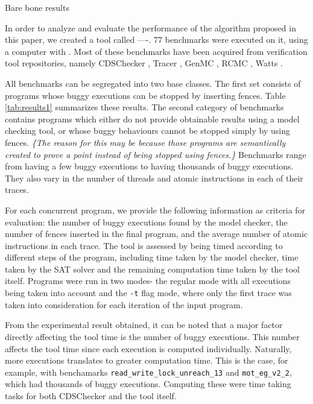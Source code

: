 \begin{table}
		
	\caption{Bare bone results}
	\label{tab:results1}
\end{table}

In order to analyze and evaluate the performance of the algorithm 
proposed in this paper, we created a tool called ----. 77 benchmarks were
executed on it, using a computer with .
Most of these benchmarks have been acquired from verification tool
repositories, namely CDSChecker \cite{cds}, Tracer \cite{tracer2018},
GenMC \cite{genmc-PLDI19}, RCMC \cite{rcmc-POPL18}, Watts \cite{watts}.

All benchmarks can be segregated into two base classes. The first set consists of 
programs whose buggy executions can be stopped by inserting fences. Table \ref{tab:results1}
summarizes these results. The second category of benchmarks contains programs which
either do not provide obtainable results using a model checking tool, or
whose buggy behaviours cannot be stopped simply by using fences. \textit{\{The reason
for this may be because those programs are semantically created to prove
a point instead of being stopped using fences.\}} Benchmarks range from
having a few buggy executions to having thousands of buggy executions. They
also vary in the number of threads and atomic instructions in each of
their traces.

For each concurrent program, we provide the following information as criteria for evaluation:
the number of buggy executions found by the model checker, the number of fences
inserted in the final program, and the average number of atomic instructions
in each trace. The tool is assessed by being timed according to different steps
of the program, including time taken by the model checker, time taken by the
SAT solver and the remaining computation time taken by the tool itself. Programs
were run in two modes- the regular mode with all executions
being taken into account and the \texttt{-t} flag mode, where only the first
trace was taken into consideration for each iteration of the input program.

From the experimental result obtained, it can be noted that a major factor directly affecting 
the tool time is the number of buggy executions. This number affects the tool 
time since each execution is computed individually. Naturally, more executions translates to
greater computation time. This is the case, for example, with benchamarks
\texttt{read\_write\_lock\_unreach\_13} and \texttt{mot\_eg\_v2\_2}, which had thousands
of buggy executions. Computing these were time taking tasks for 
both CDSChecker and the tool itself.

